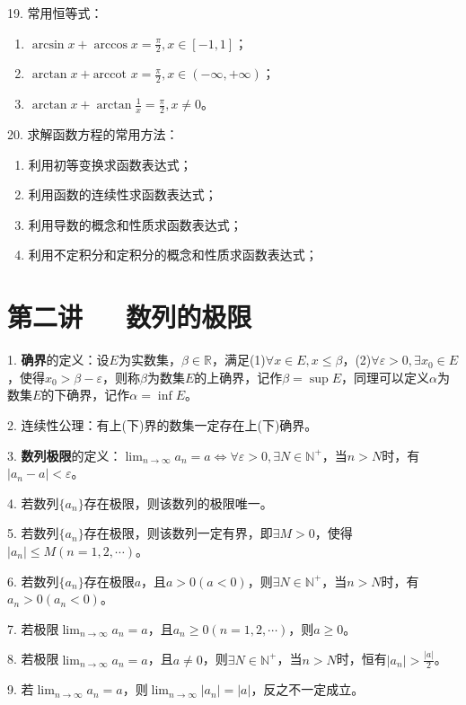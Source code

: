 \documentclass[UTF8]{ctexart}
\theoremstyle{remark}
\begin{document}
	19. 常用恒等式：
	\begin{enumerate}
		\item \(\arcsin x+\arccos x=\frac{\pi}{2},x\in[-1,1]\)；
	\item \(\arctan x+\text{arccot }x=\frac{\pi}{2},x\in(-\infty,+\infty)\)；
	\item \(\arctan x+\arctan\frac{1}{x}=\frac{\pi}{2},x\neq0\)。
	\end{enumerate}
	
	20. 求解函数方程的常用方法：
	\begin{enumerate}
	\item 利用初等变换求函数表达式；
	\item 利用函数的连续性求函数表达式；
	\item 利用导数的概念和性质求函数表达式；
	\item 利用不定积分和定积分的概念和性质求函数表达式；
	\end{enumerate}
	
	\section{第二讲~~~数列的极限}
	1. \textbf{确界}的定义：设\(E\)为实数集，\(\beta\in\mathbb{R}\)，满足(1)\(\forall x\in E,x\leq\beta\)，(2)\(\forall\varepsilon>0,\exists x_0\in E\)，使得\(x_0>\beta - \varepsilon\)，则称\(\beta\)为数集\(E\)的上确界，记作\(\beta = \sup E\)，同理可以定义\(\alpha\)为数集\(E\)的下确界，记作\(\alpha = \inf E\)。
	
	2. 连续性公理：有上(下)界的数集一定存在上(下)确界。
	
	3. \textbf{数列极限}的定义：\(\lim_{n\rightarrow\infty}a_n = a\Leftrightarrow\forall\varepsilon>0,\exists N\in\mathbb{N}^+\)，当\(n > N\)时，有\(|a_n - a|<\varepsilon\)。
	
	4. 若数列\(\{a_n\}\)存在极限，则该数列的极限唯一。
	
	5. 若数列\(\{a_n\}\)存在极限，则该数列一定有界，即\(\exists M>0\)，使得\(|a_n|\leq M(n = 1,2,\cdots)\)。
	
	6. 若数列\(\{a_n\}\)存在极限\(a\)，且\(a>0(a < 0)\)，则\(\exists N\in\mathbb{N}^+\)，当\(n > N\)时，有\(a_n>0(a_n < 0)\)。
	
	7. 若极限\(\lim_{n\rightarrow\infty}a_n = a\)，且\(a_n\geq0(n = 1,2,\cdots)\)，则\(a\geq0\)。
	
	8. 若极限\(\lim_{n\rightarrow\infty}a_n = a\)，且\(a\neq0\)，则\(\exists N\in\mathbb{N}^+\)，当\(n > N\)时，恒有\(|a_n|>\frac{|a|}{2}\)。
	
	9. 若\(\lim_{n\rightarrow\infty}a_n = a\)，则\(\lim_{n\rightarrow\infty}|a_n| = |a|\)，反之不一定成立。
	
\end{document}
